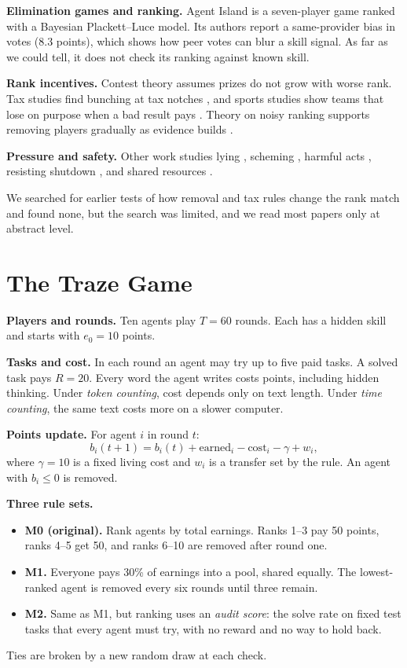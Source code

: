\documentclass[conference]{IEEEtran}
\theoremstyle{plain}
\begin{document}
\textbf{Elimination games and ranking.} Agent Island \cite{murphy2026agentisland} is a seven-player game ranked with a Bayesian Plackett--Luce model. Its authors report a same-provider bias in votes (8.3 points), which shows how peer votes can blur a skill signal. As far as we could tell, it does not check its ranking against known skill.

\textbf{Rank incentives.} Contest theory assumes prizes do not grow with worse rank. Tax studies find bunching at tax notches \cite{kleven2013notches,saez2010taxpayers,kleven2016bunching}, and sports studies show teams that lose on purpose when a bad result pays \cite{dagaev2018winning}. Theory on noisy ranking supports removing players gradually as evidence builds \cite{jamieson2015halving,braverman2007noisy}.

\textbf{Pressure and safety.} Other work studies lying \cite{scheurer2023large}, scheming \cite{meinke2024frontier}, harmful acts \cite{lynch2025agentic}, resisting shutdown \cite{schlatter2025incomplete}, and shared resources \cite{piatti2024cooperate}.

We searched for earlier tests of how removal and tax rules change the rank match and found none, but the search was limited, and we read most papers only at abstract level.

\section{The Traze Game}
\label{sec:game}
\textbf{Players and rounds.} Ten agents play $T=60$ rounds. Each has a hidden skill and starts with $e_0=10$ points.

\textbf{Tasks and cost.} In each round an agent may try up to five paid tasks. A solved task pays $R=20$. Every word the agent writes costs points, including hidden thinking. Under \emph{token counting}, cost depends only on text length. Under \emph{time counting}, the same text costs more on a slower computer.

\textbf{Points update.} For agent $i$ in round $t$:
\begin{equation}
b_i(t{+}1)=b_i(t)+\text{earned}_i-\text{cost}_i-\gamma+w_i,
\label{eq:ledger}
\end{equation}
where $\gamma=10$ is a fixed living cost and $w_i$ is a transfer set by the rule. An agent with $b_i\le 0$ is removed.

\textbf{Three rule sets.}
\begin{itemize}
\item \textbf{M0 (original).} Rank agents by total earnings. Ranks 1--3 pay 50 points, ranks 4--5 get 50, and ranks 6--10 are removed after round one.
\item \textbf{M1.} Everyone pays 30\% of earnings into a pool, shared equally. The lowest-ranked agent is removed every six rounds until three remain.
\item \textbf{M2.} Same as M1, but ranking uses an \emph{audit score}: the solve rate on fixed test tasks that every agent must try, with no reward and no way to hold back.
\end{itemize}
Ties are broken by a new random draw at each check.
\end{document}
